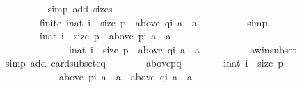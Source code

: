 \begin{isabellebody}
\ \ \ \ \ \ \ \ \isamarkupfalse%
\ {\isacharparenleft}{\kern0pt}simp\ add{\isacharcolon}{\kern0pt}\ sizes{\isacharparenright}{\kern0pt}\isanewline
\ \ \ \ \ \ \isamarkupfalse%
\ \isamarkupfalse%
\isanewline
\ \ \ \ \ \ \ \ {\isachardoublequoteopen}finite\ {\isacharbraceleft}{\kern0pt}i{\isacharcolon}{\kern0pt}{\isacharcolon}{\kern0pt}nat{\isachardot}{\kern0pt}\ i\ {\isacharless}{\kern0pt}\ size\ p\ {\isasymand}\ above\ {\isacharparenleft}{\kern0pt}q{\isacharbang}{\kern0pt}i{\isacharparenright}{\kern0pt}\ a\ {\isacharequal}{\kern0pt}\ {\isacharbraceleft}{\kern0pt}a{\isacharbraceright}{\kern0pt}{\isacharbraceright}{\kern0pt}{\isachardoublequoteclose}\isanewline
\ \ \ \ \ \ \ \ \isamarkupfalse%
\ simp\isanewline
\ \ \ \ \ \ \isamarkupfalse%
\ \isamarkupfalse%
\isanewline
\ \ \ \ \ \ \ \ {\isachardoublequoteopen}{\isacharbraceleft}{\kern0pt}i{\isacharcolon}{\kern0pt}{\isacharcolon}{\kern0pt}nat{\isachardot}{\kern0pt}\ i\ {\isacharless}{\kern0pt}\ size\ p\ {\isasymand}\ above\ {\isacharparenleft}{\kern0pt}p{\isacharbang}{\kern0pt}i{\isacharparenright}{\kern0pt}\ a\ {\isacharequal}{\kern0pt}\ {\isacharbraceleft}{\kern0pt}a{\isacharbraceright}{\kern0pt}{\isacharbraceright}{\kern0pt}\ {\isacharequal}{\kern0pt}\isanewline
\ \ \ \ \ \ \ \ \ \ \ \ \ \ {\isacharbraceleft}{\kern0pt}i{\isacharcolon}{\kern0pt}{\isacharcolon}{\kern0pt}nat{\isachardot}{\kern0pt}\ i\ {\isacharless}{\kern0pt}\ size\ p\ {\isasymand}\ above\ {\isacharparenleft}{\kern0pt}q{\isacharbang}{\kern0pt}i{\isacharparenright}{\kern0pt}\ a\ {\isacharequal}{\kern0pt}\ {\isacharbraceleft}{\kern0pt}a{\isacharbraceright}{\kern0pt}{\isacharbraceright}{\kern0pt}{\isachardoublequoteclose}\isanewline
\ \ \ \ \ \ \ \ \isamarkupfalse%
\ a{\isacharunderscore}{\kern0pt}win{\isacharunderscore}{\kern0pt}subset\isanewline
\ \ \ \ \ \ \ \ \isamarkupfalse%
\ {\isacharparenleft}{\kern0pt}simp\ add{\isacharcolon}{\kern0pt}\ card{\isacharunderscore}{\kern0pt}subset{\isacharunderscore}{\kern0pt}eq{\isacharparenright}{\kern0pt}\isanewline
\ \ \ \ \ \ \isamarkupfalse%
\ above{\isacharunderscore}{\kern0pt}pq{\isacharcolon}{\kern0pt}\isanewline
\ \ \ \ \ \ \ \ {\isachardoublequoteopen}{\isasymforall}i{\isacharcolon}{\kern0pt}{\isacharcolon}{\kern0pt}nat{\isachardot}{\kern0pt}\ i\ {\isacharless}{\kern0pt}\ size\ p\ {\isasymlongrightarrow}\isanewline
\ \ \ \ \ \ \ \ \ \ \ \ above\ {\isacharparenleft}{\kern0pt}p{\isacharbang}{\kern0pt}i{\isacharparenright}{\kern0pt}\ a\ {\isacharequal}{\kern0pt}\ {\isacharbraceleft}{\kern0pt}a{\isacharbraceright}{\kern0pt}\ {\isasymlongleftrightarrow}\ above\ {\isacharparenleft}{\kern0pt}q{\isacharbang}{\kern0pt}i{\isacharparenright}{\kern0pt}\ a\ {\isacharequal}{\kern0pt}\ {\isacharbraceleft}{\kern0pt}a{\isacharbraceright}{\kern0pt}{\isachardoublequoteclose}\isanewline

\end{isabellebody}
